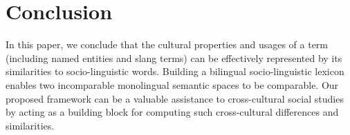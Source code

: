 \section{Conclusion}
In this paper, we conclude that the cultural properties and usages of a term (including named entities and slang terms) can be effectively represented by its similarities to socio-linguistic words. 
Building a bilingual socio-linguistic lexicon enables two incomparable 
monolingual semantic spaces to be comparable. 
Our proposed framework can be a valuable assistance to cross-cultural 
social studies by acting as a building block for 
computing such cross-cultural differences and similarities. 
